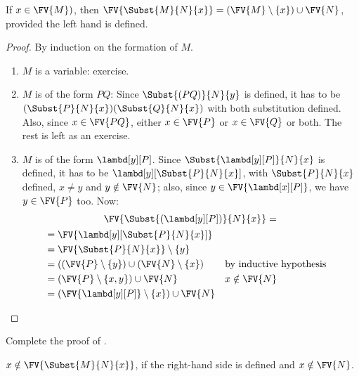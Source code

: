\documentclass[../../../include/open-logic-section]{subfiles}
\begin{document}
\begin{thm} 
  If $x \in \FV{M})$, then $\FV{\Subst{M}{N}{x}} = (\FV{M} \setminus
  \{x\}) \cup \FV{N}$, provided the left hand is defined.
\end{thm}

\begin{proof}
  By induction on the formation of $M$.
  \begin{enumerate}
  \item $M$ is a variable: exercise.
  \item $M$ is of the form $PQ$: Since
    $\Subst{(PQ)}{N}{y}$ is defined, it has to be
    $(\Subst{P}{N}{x})(\Subst{Q}{N}{x})$ with both substitution
    defined. Also, since $x \in \FV{PQ}$, either $x \in \FV{P}$ or
    $x \in \FV{Q}$ or both. The rest is left as an exercise.
  \item $M$ is of the form $\lambd[y][P]$. Since
    $\Subst{\lambd[y][P]}{N}{x}$ is defined, it has to be
    $\lambd[y][\Subst{P}{N}{x}]$, with $\Subst{P}{N}{x}$
    defined, $x \neq y$ and $y \notin \FV{N}$; also, since $y \in
    \FV{\lambd[x][P]}$, we have $y \in \FV{P}$ too. Now:
    \begin{multline*}
      \FV{\Subst{(\lambd[y][P])}{N}{x}} = \\
      \begin{aligned}
      & = \FV{\lambd[y][\Subst{P}{N}{x}]} \\
      & = \FV{\Subst{P}{N}{x}} \setminus \{y\} \\
      & = ((\FV{P} \setminus \{y\}) \cup (\FV{N} \setminus \{x\})
       && \text{by inductive hypothesis} \\
      & = (\FV{P} \setminus \{x, y\}) \cup \FV{N}
       && x \notin \FV{N} \\
      & = (\FV{\lambd[y][P]} \setminus \{x\}) \cup \FV{N}
      \end{aligned}
      \end{multline*}
  \end{enumerate}
\end{proof}

\begin{prob}
  Complete the proof of .
\end{prob}

\begin{thm}
  $x \notin \FV{\Subst{M}{N}{x}}$, if the right-hand side is
  defined and $x \notin \FV{N}$.
\end{thm}
\end{document}
